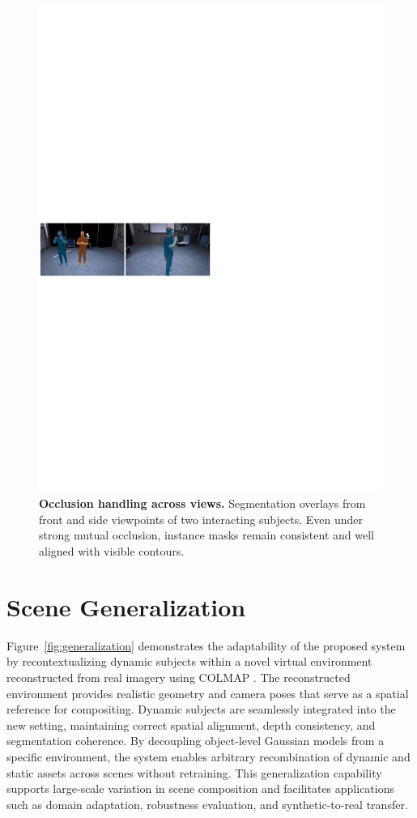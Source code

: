 \begin{figure}[ht]
    \centering
    \includegraphics[width=\linewidth]{Grafiken/Oclusion.pdf}
    \caption{
        \textbf{Occlusion handling across views.}
        Segmentation overlays from front and side viewpoints of two interacting subjects.
        Even under strong mutual occlusion, instance masks remain consistent and well aligned with visible contours.
    }
    \label{fig:occlusion}
\end{figure}

\section{Scene Generalization}
Figure~\ref{fig:generalization} demonstrates the adaptability of the proposed system by recontextualizing dynamic subjects within a novel virtual environment reconstructed from real imagery using COLMAP \cite{schoenberger2016sfm}. 
The reconstructed environment provides realistic geometry and camera poses that serve as a spatial reference for compositing. 
Dynamic subjects are seamlessly integrated into the new setting, maintaining correct spatial alignment, depth consistency, and segmentation coherence. 
By decoupling object-level Gaussian models from a specific environment, the system enables arbitrary recombination of dynamic and static assets across scenes without retraining. 
This generalization capability supports large-scale variation in scene composition and facilitates applications such as domain adaptation, robustness evaluation, and synthetic-to-real transfer.

